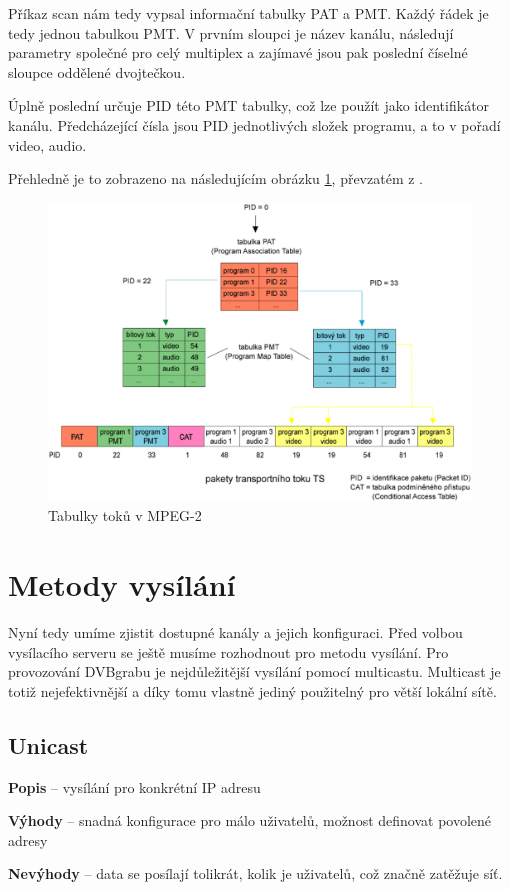 Příkaz scan nám tedy vypsal informační tabulky PAT a PMT. Každý řádek je tedy jednou tabulkou PMT. V prvním sloupci je název kanálu, následují parametry společné pro celý multiplex a zajímavé jsou pak poslední číselné sloupce oddělené dvojtečkou.

Úplně poslední určuje PID této PMT tabulky, což lze použít jako identifikátor kanálu.
Předcházející čísla jsou PID jednotlivých složek programu, a to v pořadí video, audio.

Přehledně je to zobrazeno na následujícím obrázku \ref{fig:PATaPMT}, převzatém z \cite{digitvURL}.
\vfill
\pagebreak

\begin{figure}[ht]
\begin{center}
\includegraphics[width=15cm]{images/PATaPMT.eps}
\caption{Tabulky toků v MPEG-2}
\label{fig:PATaPMT}
\end{center}
\end{figure}

\section{Metody vysílání}
Nyní tedy umíme zjistit dostupné kanály a jejich konfiguraci. Před volbou vysílacího serveru se ještě musíme rozhodnout pro metodu vysílání.
Pro provozování DVBgrabu je nejdůležitější vysílání pomocí multicastu. Multicast je totiž nejefektivnější a díky tomu vlastně jediný použitelný pro větší lokální sítě. 

\subsection{Unicast}
\bitem
\item \textbf{Popis} -- vysílání pro konkrétní IP adresu
\item \textbf{Výhody} -- snadná konfigurace pro málo uživatelů, možnost definovat povolené adresy
\item \textbf{Nevýhody} -- data se posílají tolikrát, kolik je uživatelů, což značně zatěžuje síť.
\eitem

